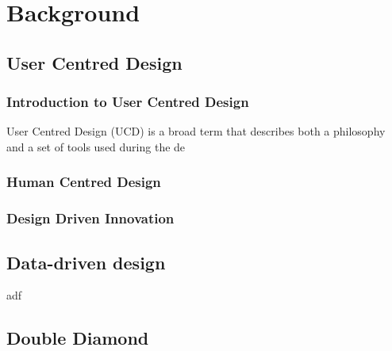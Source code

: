 
\chapter{Background}

	\section{User Centred Design}

		\subsection{Introduction to User Centred Design}

User Centred Design (UCD) is a broad term that describes both a philosophy and a set of tools used during the de

		\subsection{Human Centred Design}
		
		
		\subsection{Design Driven Innovation}




	\section{Data-driven design}



adf


	\section{Double Diamond}